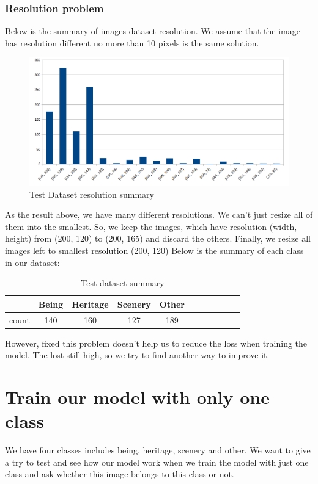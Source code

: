 \documentclass[11pt]{article}
\begin{document}
\subsubsection{Resolution problem}
Below is the summary of images dataset resolution. We assume that the image has resolution different no more than 10 pixels is the same solution.

\begin{figure}[H]
\centering
\includegraphics[width=1\textwidth]{images/resolution_summary}
\caption{Test Dataset resolution summary}
\end{figure}

As the result above, we have many different resolutions. We can't just resize all of them into the smallest. So, we keep the images, which have resolution (width, height) from (200, 120) to (200, 165) and discard the others.
Finally, we resize all images left to smallest resolution (200, 120)
Below is the summary of each class in our dataset:
\begin{table}[H]
\begin{center}
\begin{tabular}{| c | c | c | c | c | c | c | c | c | c | c |}
\hline
 & Being & Heritage & Scenery & Other\\
\hline
count & 140 & 160 & 127 & 189\\

\hline
\end{tabular}
\caption {Test dataset summary}
\end{center}
\end{table}

However, fixed this problem doesn't help us to reduce the loss when training the model. The lost still high, so we try to find another way to improve it.

\section{Train our model with only one class}
We have four classes includes being, heritage, scenery and other. We want to give a try to test and see how our model work when we train the model with just one class and ask whether this image belongs to this class or not.
\end{document}
